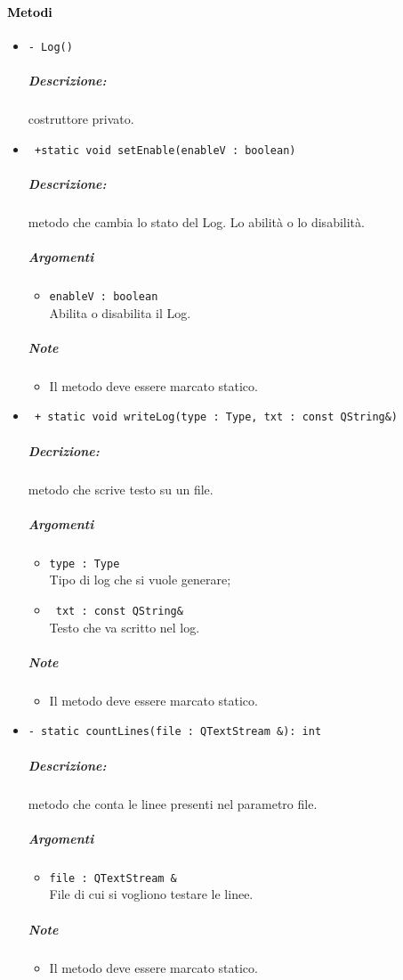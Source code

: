 \paragraph{\textcolor{black}{Metodi\\}}
	\begin{itemize}
		\item \color{blue}\verb!- Log()!
		\color{black}
		\subparagraph{Descrizione:} costruttore privato.
		
		\item \color{blue}\verb! +static void setEnable(enableV : boolean)!\\
		\color{black}
		\subparagraph{Descrizione:} metodo che cambia lo stato del Log. Lo abilità o lo disabilità.
		\subparagraph{Argomenti}
			\begin{itemize}
				\item \color{RoyalPurple}\verb!enableV : boolean!\\
				\color{black}Abilita o disabilita il Log.
			\end{itemize}
		\subparagraph{Note}
					\begin{itemize}
						\item Il metodo deve essere marcato statico.
					\end{itemize}
			
		\item \color{blue}\verb! + static void writeLog(type : Type, txt : const QString&)!\\
		\color{black}
		\subparagraph{Decrizione:} metodo che scrive testo su un file.
		\subparagraph{Argomenti}
			\begin{itemize}
				\item \color{blue}\verb!type : Type!\\
				\color{black}Tipo di log che si vuole generare;
				
				\item \color{blue}\verb! txt : const QString&!\\
				\color{black}Testo che va scritto nel log.
			\end{itemize}
		\subparagraph{Note}
					\begin{itemize}
						\item Il metodo deve essere marcato statico.
					\end{itemize}
			
		\item \color{blue}\verb!- static countLines(file : QTextStream &): int!
		\color{black}
		\subparagraph{Descrizione:} metodo che conta le linee presenti nel parametro file.
		\subparagraph{Argomenti}	
			\begin{itemize}
				\item \color{RoyalPurple}\verb!file : QTextStream &!\\
				\color{black}File di cui si vogliono testare le linee.
			\end{itemize}
		\subparagraph{Note}
					\begin{itemize}
						\item Il metodo deve essere marcato statico.
					\end{itemize}
			

\end{itemize}
